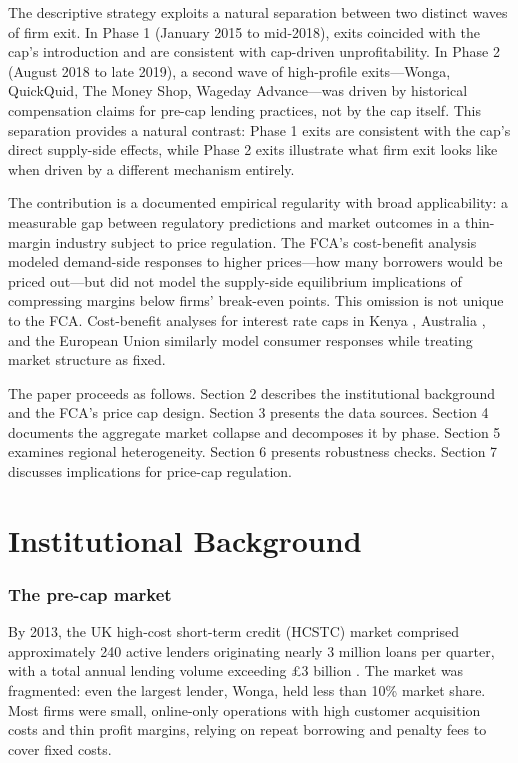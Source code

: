 \documentclass[12pt]{article}
\begin{document}
The descriptive strategy exploits a natural separation between two distinct waves of firm exit. In Phase 1 (January 2015 to mid-2018), exits coincided with the cap's introduction and are consistent with cap-driven unprofitability. In Phase 2 (August 2018 to late 2019), a second wave of high-profile exits---Wonga, QuickQuid, The Money Shop, Wageday Advance---was driven by historical compensation claims for pre-cap lending practices, not by the cap itself. This separation provides a natural contrast: Phase 1 exits are consistent with the cap's direct supply-side effects, while Phase 2 exits illustrate what firm exit looks like when driven by a different mechanism entirely.

The contribution is a documented empirical regularity with broad applicability: a measurable gap between regulatory predictions and market outcomes in a thin-margin industry subject to price regulation. The FCA's cost-benefit analysis modeled demand-side responses to higher prices---how many borrowers would be priced out---but did not model the supply-side equilibrium implications of compressing margins below firms' break-even points. This omission is not unique to the FCA. Cost-benefit analyses for interest rate caps in Kenya \citep{maimbo2014interest}, Australia \citep{banks2015review}, and the European Union \citep{eur2021consumer} similarly model consumer responses while treating market structure as fixed.

The paper proceeds as follows. Section 2 describes the institutional background and the FCA's price cap design. Section 3 presents the data sources. Section 4 documents the aggregate market collapse and decomposes it by phase. Section 5 examines regional heterogeneity. Section 6 presents robustness checks. Section 7 discusses implications for price-cap regulation.

\section{Institutional Background}

\subsubsection*{The pre-cap market} By 2013, the UK high-cost short-term credit (HCSTC) market comprised approximately 240 active lenders originating nearly 3 million loans per quarter, with a total annual lending volume exceeding \pounds3 billion \citep{cma2015payday}. The market was fragmented: even the largest lender, Wonga, held less than 10\% market share. Most firms were small, online-only operations with high customer acquisition costs and thin profit margins, relying on repeat borrowing and penalty fees to cover fixed costs.
\end{document}
